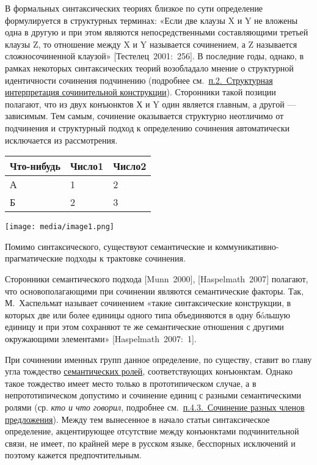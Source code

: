 В формальных синтаксических теориях близкое по сути определение
формулируется в структурных терминах: «Если две клаузы X и Y не вложены
одна в другую и при этом являются непосредственными составляющими
третьей клаузы Z, то отношение между X и Y называется сочинением, а Z
называется сложносочиненной клаузой» {[}Тестелец~2001:~256{]}. В
последние годы, однако, в рамках некоторых синтаксических теорий
возобладало мнение о структурной идентичности сочинения подчинению
(подробнее см.~\underline{п.2.~Структурная интерпретация сочинительной
конструкции}). Сторонники такой позиции полагают, что из двух конъюнктов
Х и Y один является главным, а другой --- зависимым. Тем самым, сочинение
оказывается структурно неотличимо от подчинения и структурный подход к
определению сочинения автоматически исключается из рассмотрения.

\begin{longtable}[]{@{}lll@{}}
\toprule
Что-нибудь & Число1 & Число2 \\
\midrule
\endhead
А & 1 & 2 \\
Б & 2 & 3 \\
\bottomrule
\end{longtable}

\texttt{[image: media/image1.png]}

Помимо синтаксического, существуют семантические и
коммуникативно-прагматические подходы к трактовке сочинения.

Сторонники семантического подхода {[}Munn~2000{]}, {[}Haspelmath~2007{]}
полагают, что основополагающими при сочинении являются семантические
факторы. Так, М.~Хаспельмат называет сочинением «такие синтаксические
конструкции, в которых две или более единицы одного типа объединяются в
одну бóльшую единицу и при этом сохраняют те же семантические отношения
с другими окружающими элементами» {[}Haspelmath~2007:~1{]}.

При сочинении именных групп данное определение, по существу, ставит во
главу угла тождество \underline{семантических ролей}, соответствующих
конъюнктам. Однако такое тождество имеет место только в прототипическом
случае, а в непрототипическом допустимо и сочинение единиц с разными
семантическими ролями (ср. \textit{кто и что говорил}, подробнее
см.~\underline{п.4.3.~Сочинение разных членов предложения}). Между тем
вынесенное в начало статьи синтаксическое определение, акцентирующее
отсутствие между конъюнктами подчинительной связи, не имеет, по крайней
мере в русском языке, бесспорных исключений и поэтому кажется
предпочтительным.

